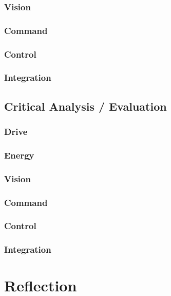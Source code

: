\documentclass[10pt,twoside]{article}
\begin{document}
\subsubsection{Vision}

\subsubsection{Command}

\subsubsection{Control}

\subsubsection{Integration}

\subsection{Critical Analysis / Evaluation}

\subsubsection{Drive}

\subsubsection{Energy}

\subsubsection{Vision}

\subsubsection{Command}

\subsubsection{Control}

\subsubsection{Integration}

\section{Reflection}
\end{document}
